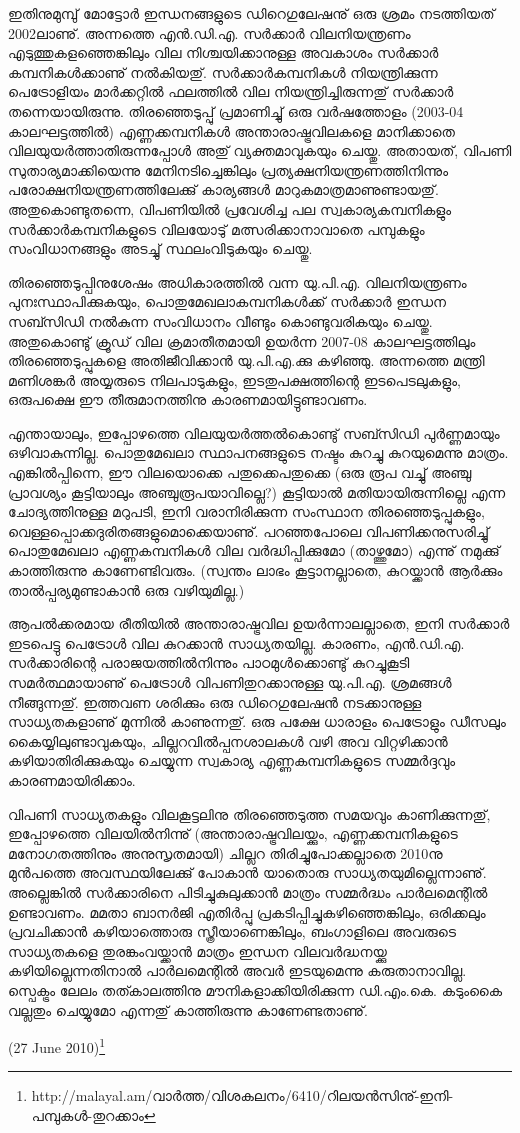ഇതിനുമുമ്പു് മോട്ടോര്‍ ഇന്ധനങ്ങളുടെ ഡിറെഗുലേഷനു് ഒരു ശ്രമം നടത്തിയത് 2002ലാണു്. അന്നത്തെ 
എന്‍.ഡി.എ. സര്‍ക്കാര്‍ വിലനിയന്ത്രണം എടുത്തുകളഞ്ഞെങ്കിലും വില നിശ്ചയിക്കാനുള്ള അവകാശം സര്‍ക്കാര്‍ 
കമ്പനികള്‍ക്കാണു് നല്‍കിയതു്. സര്‍ക്കാര്‍കമ്പനികള്‍ നിയന്ത്രിക്കുന്ന പെട്രോളിയം മാര്‍ക്കറ്റില്‍ ഫലത്തില്‍ വില 
നിയന്ത്രിച്ചിരുന്നതു് സര്‍ക്കാര്‍ തന്നെയായിരുന്നു. തിരഞ്ഞെടുപ്പു് പ്രമാണിച്ചു് ഒരു വര്‍ഷത്തോളം (2003-04 
കാലഘട്ടത്തില്‍) എണ്ണക്കമ്പനികള്‍ അന്താരാഷ്ട്രവിലകളെ മാനിക്കാതെ വിലയുയര്‍ത്താതിരുന്നപ്പോള്‍ 
അതു് വ്യക്തമാവുകയും ചെയ്തു. അതായത്, വിപണി സുതാര്യമാക്കിയെന്നു മേനിനടിച്ചെങ്കിലും പ്രത്യക്ഷനിയന്ത്രണത്തിനിന്നും പരോക്ഷനിയന്ത്രണത്തിലേക്കു് കാര്യങ്ങള്‍ മാറുകമാത്രമാണുണ്ടായതു്. അതുകൊണ്ടുതന്നെ, വിപണിയില്‍ 
പ്രവേശിച്ച പല സ്വകാര്യകമ്പനികളും സര്‍ക്കാര്‍കമ്പനികളുടെ വിലയോടു് മത്സരിക്കാനാവാതെ പമ്പുകളും 
സംവിധാനങ്ങളും അടച്ചു് സ്ഥലംവിടുകയും ചെയ്തു.

തിരഞ്ഞെടുപ്പിനുശേഷം അധികാരത്തില്‍ വന്ന യു.പി.എ. വിലനിയന്ത്രണം പുനഃസ്ഥാപിക്കുകയും, 
പൊതുമേഖലാകമ്പനികള്‍ക്ക് സര്‍ക്കാര്‍ ഇന്ധന സബ്സിഡി നല്‍കുന്ന സംവിധാനം വീണ്ടും കൊണ്ടുവരികയും 
ചെയ്തു. അതുകൊണ്ടു് ക്രൂഡ് വില ക്രമാതീതമായി ഉയര്‍ന്ന 2007-08 കാലഘട്ടത്തിലും തിരഞ്ഞെടുപ്പുകളെ 
അതിജീവിക്കാന്‍ യു.പി.എ.ക്കു കഴിഞ്ഞു. അന്നത്തെ മന്ത്രി മണിശങ്കര്‍ അയ്യരുടെ നിലപാടുകളും, ഇടതുപക്ഷത്തിന്റെ 
ഇടപെടലുകളും, ഒരുപക്ഷെ ഈ തീരുമാനത്തിനു കാരണമായിട്ടുണ്ടാവണം.

എന്തായാലും, ഇപ്പോഴത്തെ വിലയുയര്‍ത്തല്‍കൊണ്ടു് സബ്സിഡി പുര്‍ണ്ണമായും ഒഴിവാകുന്നില്ല. പൊതുമേഖലാ 
സ്ഥാപനങ്ങളുടെ നഷ്ടം കുറച്ചു കുറയുമെന്നു മാത്രം. എങ്കില്‍പ്പിന്നെ, ഈ വിലയൊക്കെ പതുക്കെപതുക്കെ (ഒരു രൂപ 
വച്ചു് അഞ്ചു പ്രാവശ്യം കൂട്ടിയാലും അഞ്ചുരൂപയാവില്ലെ?) കൂട്ടിയാല്‍ മതിയായിരുന്നില്ലെ എന്ന ചോദ്യത്തിനുള്ള മറുപടി, 
ഇനി വരാനിരിക്കുന്ന സംസ്ഥാന തിരഞ്ഞെടുപ്പുകളും, വെള്ളപ്പൊക്കദുരിതങ്ങളുമൊക്കെയാണു്. പറഞ്ഞപോലെ 
വിപണിക്കനുസരിച്ചു് പൊതുമേഖലാ എണ്ണകമ്പനികള്‍ വില വര്‍ദ്ധിപ്പിക്കുമോ (താഴ്ത്തുമോ) എന്നു് നമുക്കു് കാത്തിരുന്നു 
കാണേണ്ടിവരും. (സ്വന്തം ലാഭം കൂട്ടാനല്ലാതെ, കുറയ്ക്കാന്‍ ആര്‍ക്കും താല്‍പ്പര്യമുണ്ടാകാന്‍ ഒരു വഴിയുമില്ല.)

ആപല്‍ക്കരമായ രീതിയില്‍ അന്താരാഷ്ട്രവില ഉയര്‍ന്നാലല്ലാതെ, ഇനി സര്‍ക്കാര്‍ ഇടപെട്ടു പെട്രോള്‍ വില കുറക്കാന്‍
സാധ്യതയില്ല. കാരണം, എന്‍.ഡി.എ. സര്‍ക്കാരിന്റെ പരാജയത്തില്‍നിന്നും പാഠമുള്‍ക്കൊണ്ടു് കുറച്ചുകൂടി 
സമര്‍ത്ഥമായാണു് പെട്രോള്‍ വിപണിതുറക്കാനുള്ള യു.പി.എ. ശ്രമങ്ങള്‍ നീങ്ങുന്നതു്. ഇത്തവണ ശരിക്കും ഒരു 
ഡിറെഗുലേഷന്‍ നടക്കാനുള്ള സാധ്യതകളാണു് മുന്നില്‍ കാണുന്നതു്. ഒരു പക്ഷേ ധാരാളം പെട്രോളും ഡീസലും 
കൈയ്യിലുണ്ടാവുകയും, ചില്ലറവില്‍പ്പനശാലകള്‍ വഴി അവ വിറ്റഴിക്കാന്‍ കഴിയാതിരിക്കുകയും ചെയ്യുന്ന സ്വകാര്യ 
എണ്ണകമ്പനികളുടെ സമ്മര്‍ദ്ദവും കാരണമായിരിക്കാം.

വിപണി സാധ്യതകളും വിലകൂട്ടലിനു തിരഞ്ഞെടുത്ത സമയവും കാണിക്കുന്നതു്, ഇപ്പോഴത്തെ വിലയില്‍നിന്നു് 
(അന്താരാഷ്ട്രവിലയ്ക്കും, എണ്ണക്കമ്പനികളുടെ മനോഗതത്തിനും അനുസൃതമായി) ചില്ലറ തിരിച്ചുപോക്കല്ലാതെ 2010നു 
മുന്‍പത്തെ അവസ്ഥയിലേക്കു് പോകാന്‍ യാതൊരു സാധ്യതയുമില്ലെന്നാണു്. അല്ലെങ്കില്‍ സര്‍ക്കാരിനെ 
പിടിച്ചുകുലുക്കാന്‍ മാത്രം സമ്മര്‍ദ്ധം പാര്‍ലമെന്റില്‍ ഉണ്ടാവണം. മമതാ ബാനര്‍ജി എതിര്‍പ്പു പ്രകടിപ്പിച്ചുകഴിഞ്ഞെങ്കിലും,
ഒരിക്കലും പ്രവചിക്കാന്‍ കഴിയാത്തൊരു സ്ത്രീയാണെങ്കിലും, ബംഗാളിലെ അവരുടെ സാധ്യതകളെ തുരങ്കംവയ്ക്കാന്‍ മാത്രം
ഇന്ധന വിലവര്‍ദ്ധനയ്ക്കു കഴിയില്ലെന്നതിനാല്‍ പാര്‍ലമെന്റില്‍ അവര്‍ ഇടയുമെന്നു കരുതാനാവില്ല. സ്പെക്ട്രം ലേലം
തത്കാലത്തിനു മൗനികളാക്കിയിരിക്കുന്ന ഡി.എം.കെ. കടുംകൈ വല്ലതും ചെയ്യുമോ എന്നതു് കാത്തിരുന്നു 
കാണേണ്ടതാണു്.

(27 June 2010)\footnote{http://malayal.am/വാര്‍ത്ത/വിശകലനം/6410/റിലയന്‍സിനു്-ഇനി-പമ്പുകള്‍-തുറക്കാം}

\newpage
